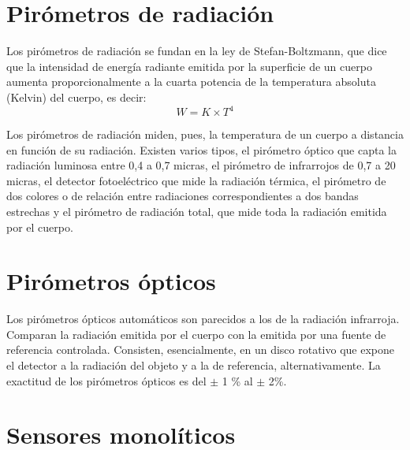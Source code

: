 \section{Pirómetros de radiación}
Los pirómetros de radiación se fundan en la ley de Stefan-Boltzmann, que dice que la intensidad de energía radiante emitida por la superficie de un cuerpo aumenta proporcionalmente a la cuarta potencia de la temperatura absoluta (Kelvin) del cuerpo, es decir:
\begin{equation}
    W = K \times T^4
\end{equation}

Los pirómetros de radiación miden, pues, la temperatura de un cuerpo a distancia en función de su radiación. Existen varios tipos, el pirómetro óptico que capta la radiación luminosa entre 0,4 a 0,7 micras, el pirómetro de infrarrojos de 0,7 a 20 micras, el detector fotoeléctrico que mide la radiación térmica, el pirómetro de dos colores o de relación entre radiaciones correspondientes a dos bandas estrechas y el pirómetro de radiación total, que mide toda la radiación emitida por el cuerpo.

\section{Pirómetros ópticos}
Los pirómetros ópticos automáticos son parecidos a los de la radiación infrarroja. Comparan la radiación emitida por el cuerpo con la emitida por una fuente de referencia controlada. Consisten, esencialmente, en un disco rotativo que expone el detector a la radiación del objeto y a la de referencia, alternativamente. La exactitud de los pirómetros ópticos es del $\pm$ 1 \% al $\pm$ 2\%.

\section{Sensores monolíticos}

